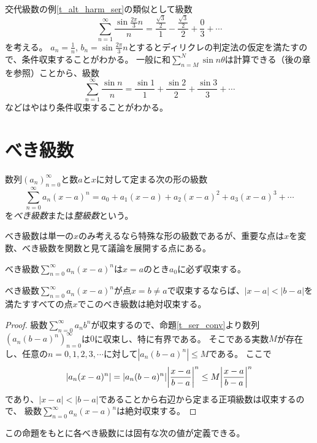 \begin{example}
交代級数の例\ref{t_alt_harm_ser}の類似として級数
$$
\sum_{n = 1}^\infty \frac{\sin\frac{2\pi}{3}n}{n} = \frac{\frac{\sqrt{3}}{2}}{1}-\frac{\frac{\sqrt{3}}{2}}{2}+\frac{0}{3}+\cdots
$$
を考える。
$a_n = \frac{1}{n}$, $b_n = \sin\frac{2\pi}{3}n$とするとディリクレの判定法の仮定を満たすので、条件収束することがわかる。
一般に和$\sum_{n = M}^N \sin n\theta$は計算できる（後の章を参照）ことから、級数
$$
\sum_{n = 1}^\infty \frac{\sin n}{n} = \frac{\sin 1}{1}+\frac{\sin 2}{2}+\frac{\sin 3}{3}+\cdots
$$
などはやはり条件収束することがわかる。
\end{example}

\section{べき級数}

\begin{definition}[べき級数]
数列$(a_n)_{n = 0}^\infty$と数$a$と$x$に対して定まる次の形の級数
$$
\sum_{n = 0}^\infty a_n(x-a)^n = a_0+a_1(x-a)+a_2(x-a)^2+a_3(x-a)^3+\cdots
$$
を\emph{べき級数}または\emph{整級数}という。
\end{definition}

べき級数は単一の$x$のみ考えるなら特殊な形の級数であるが、重要な点は$x$を変数、べき級数を関数と見て議論を展開する点にある。

\begin{remark}
べき級数$\sum_{n = 0}^\infty a_n(x-a)^n$は$x = a$のとき$a_0$に必ず収束する。
\end{remark}

\begin{proposition}[べき級数の収束性]
べき級数$\sum_{n = 0}^\infty a_n(x-a)^n$が点$x = b \ne a$で収束するならば、$|x-a| < |b-a|$を満たすすべての点$x$でこのべき級数は絶対収束する。
\end{proposition}

\begin{proof}
級数$\sum_{n = 0}^\infty a_n b^n$が収束するので、命題\ref{t_ser_conv}より数列$(a_n(b-a)^n)_{n = 0}^\infty$は$0$に収束し、特に有界である。
そこである実数$M$が存在し、任意の$n = 0, 1, 2, 3, \cdots$に対して$|a_n(b-a)^n| \le M$である。
ここで
$$
|a_n(x-a)^n| = |a_n(b-a)^n|\abs{\frac{x-a}{b-a}}^n \le M\abs{\frac{x-a}{b-a}}^n
$$
であり、$|x-a| < |b-a|$であることから右辺から定まる正項級数は収束するので、
級数$\sum_{n = 0}^\infty a_n(x-a)^n$は絶対収束する。
\end{proof}

この命題をもとに各べき級数には固有な次の値が定義できる。

